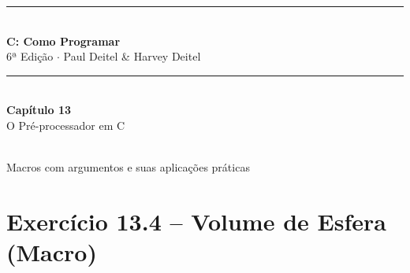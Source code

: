 \documentclass[12pt,a4paper]{article}
\begin{document}
\begin{titlepage}
  \centering\vspace*{2cm}
  {\color{deitelblue}\rule{\linewidth}{2pt}}\\[0.4cm]
  {\huge\bfseries\color{deitelblue}C: Como Programar}\\[0.2cm]
  {\large\color{deitelblue}6ª Edição $\cdot$ Paul Deitel \& Harvey Deitel}\\[0.2cm]
  {\color{deitelblue}\rule{\linewidth}{2pt}}\\[1cm]
  {\LARGE\bfseries Capítulo 13}\\[0.3cm]
  {\Large\color{deitelblue!80}O Pré-processador em C}\\[0.8cm]
  \begin{tcolorbox}[colback=deitellightblue,colframe=deitelblue,width=0.85\linewidth]
    \\[0.2cm]
    {\normalsize Macros com argumentos e suas aplicações práticas}
  \end{tcolorbox}
\end{titlepage}

\tableofcontents\newpage

\section{Exercício 13.4 -- Volume de Esfera (Macro)}
\end{document}
